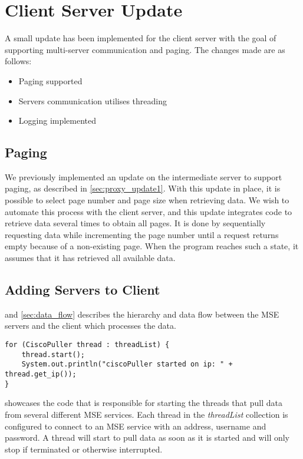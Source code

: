 \section{Client Server Update}
A small update has been implemented for the client server with the goal of supporting multi-server communication and paging. The changes made are as follows:

\begin{itemize}
\item Paging supported
\item Servers communication utilises threading
\item Logging implemented
\end{itemize}

\subsection*{Paging}
We previously implemented an update on the intermediate server to support paging, as described in \cref{sec:proxy_update1}. With this update in place, it is possible to select page number and page size when retrieving data. We wish to automate this process with the client server, and this update integrates code to retrieve data several times to obtain all pages. It is done by sequentially requesting data while incrementing the page number until a request returns empty because of a non-existing page. When the program reaches such a state, it assumes that it has retrieved all available data.

\subsection*{Adding Servers to Client}
 and \cref{sec:data_flow} describes the hierarchy and data flow between the MSE servers and the client which processes the data. 
\begin{lstlisting}[caption={Starting threads to pull data from multiple MSE servers}, label={lst:cisco_puller}, language=inc_Java]
for (CiscoPuller thread : threadList) {
    thread.start();
    System.out.println("ciscoPuller started on ip: " + thread.get_ip());
}
\end{lstlisting}
 showcases the code that is responsible for starting the threads that pull data from several different MSE services. Each thread in the \textit{threadList} collection is configured to connect to an MSE service with an address, username and password. A thread will start to pull data as soon as it is started and will only stop if terminated or otherwise interrupted.


